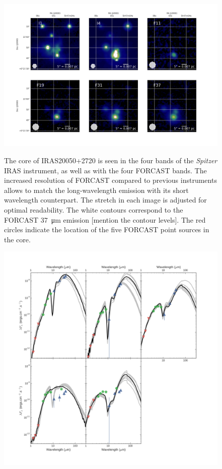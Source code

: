 \begin{figure}
\begin{center}
\includegraphics[width=1\textwidth]{Figures/NGC2071_mosaic.png}
\label{fig:NGC2071_mosaic}
\caption{The core of IRAS20050+2720 is seen in the four bands of the \textit{Spitzer} IRAS instrument, as well as with the four FORCAST bands. The increased resolution of FORCAST compared to previous instruments allows to match the long-wavelength emission with its short wavelength counterpart. The stretch in each image is adjusted for optimal readability. The white contours correspond to the FORCAST \SI{37}{\micro\meter} emission [mention the contour levels]. The red circles indicate the location of the five FORCAST point sources in the core.}
\end{center}
\end{figure}

\begin{figure}
\begin{center}
\includegraphics[width=1\textwidth]{Figures/NGC2071_SEDs.png}
\label{fig:NGC2071_SEDs}
\caption{}
\end{center}
\end{figure}

